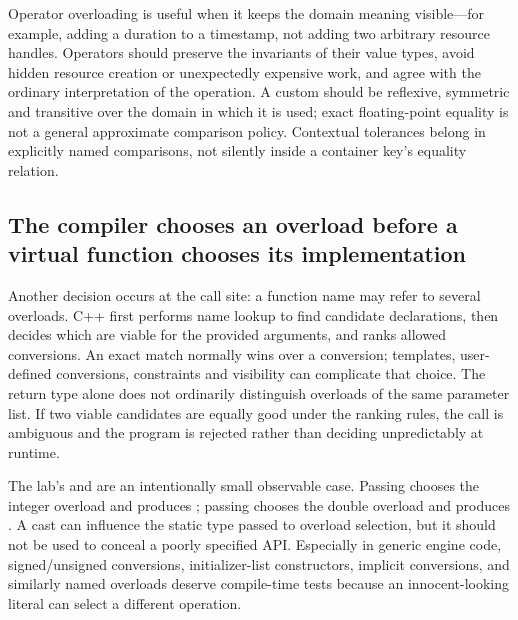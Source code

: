 Operator overloading is useful when it keeps the domain meaning visible---for example, adding a duration to a timestamp, not adding two arbitrary resource handles. Operators should preserve the invariants of their value types, avoid hidden resource creation or unexpectedly expensive work, and agree with the ordinary interpretation of the operation. A custom  should be reflexive, symmetric and transitive over the domain in which it is used; exact floating-point equality is not a general approximate comparison policy. Contextual tolerances belong in explicitly named comparisons, not silently inside a container key's equality relation.

\subsection{The compiler chooses an overload before a virtual function chooses its implementation}\label{01-foundations-i-ch004-the-compiler-chooses-an-overload-before-a-virtual-function-chooses-its-implementation}

\hypertarget{01-foundations-i-ch004-the-compiler-chooses-an-overload-before-a-virtual-function-chooses-its-implementation}{}

Another decision occurs at the call site: a function name may refer to several overloads. C++ first performs name lookup to find candidate declarations, then decides which are viable for the provided arguments, and ranks allowed conversions. An exact match normally wins over a conversion; templates, user-defined conversions, constraints and visibility can complicate that choice. The return type alone does not ordinarily distinguish overloads of the same parameter list. If two viable candidates are equally good under the ranking rules, the call is ambiguous and the program is rejected rather than deciding unpredictably at runtime.

The lab's  and  are an intentionally small observable case. Passing  chooses the integer overload and produces ; passing  chooses the double overload and produces . A cast can influence the static type passed to overload selection, but it should not be used to conceal a poorly specified API. Especially in generic engine code, signed/unsigned conversions, initializer-list constructors, implicit conversions, and similarly named overloads deserve compile-time tests because an innocent-looking literal can select a different operation.


